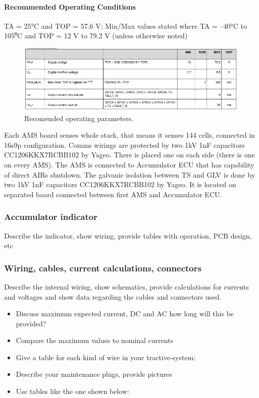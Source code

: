 \paragraph{Recommended Operating Conditions}
TA = 25°C and TOP = 57.6 V; Min/Max values stated where TA = –40°C to 105⁰C and TOP = 12 V to 79.2 V (unless otherwise noted)
\begin{figure}[H]
	\centering
	\includegraphics[width=\textwidth]{./img/BMS-operatingparms.png}
	\caption{Recomended operating parameters.}
	\label{fig:BMS-op-params}
\end{figure}


Each AMS board senses whole stack, that means it senses 144 cells, connected in 16s9p configuration. Comms wirings are protected by two 1kV 1nF capacitors CC1206KKX7RCBB102 by Yageo. There is placed one on each side (there is one on every AMS). The AMS is connected to Accumulator ECU that has capability of direct AIRs shutdown. The galvanic isolation between TS and GLV is done by two 1kV 1nF capacitors CC1206KKX7RCBB102 by Yageo. It is located on separated board connected between first AMS and Accumulator ECU.




\subsubsection{Accumulator indicator}
Describe the indicator, show wiring, provide tables with operation, PCB design, etc

\subsubsection{Wiring, cables, current calculations, connectors}
Describe the internal wiring, show schematics, provide calculations for currents and voltages and show data regarding the cables and connectors used.
\begin{itemize}
	\item 	Discuss maximum expected current, DC and AC how long will this be provided?
	\item Compare the maximum values to nominal currents
	\item Give a table for each kind of wire in your tractive-system:
	\item Describe your maintenance plugs, provide pictures
	\item Use tables like the one shown below:
\end{itemize}


